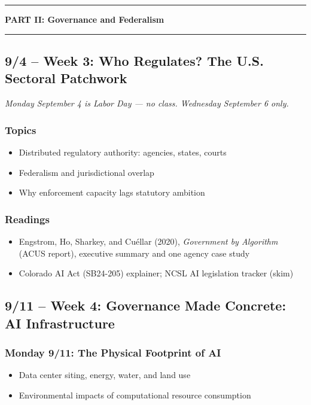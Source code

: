 \documentclass[12pt]{article}
\begin{document}
\bigskip
\noindent\rule{\textwidth}{0.6pt}
\begin{center}\textbf{PART II: Governance and Federalism}\end{center}
\noindent\rule{\textwidth}{0.6pt}

\subsection*{9/4 -- Week 3: Who Regulates? The U.S. Sectoral Patchwork}
\emph{Monday September 4 is Labor Day --- no class. Wednesday September 6 only.}
    \subsubsection*{Topics}
        \begin{itemize}
            \item Distributed regulatory authority: agencies, states, courts
            \item Federalism and jurisdictional overlap
            \item Why enforcement capacity lags statutory ambition
        \end{itemize}
    \subsubsection*{Readings}
        \begin{itemize}
            \item Engstrom, Ho, Sharkey, and Cu\'ellar (2020), \emph{Government by Algorithm} (ACUS report), executive summary and one agency case study
            \item Colorado AI Act (SB24-205) explainer; NCSL AI legislation tracker (skim)
        \end{itemize}

\subsection*{9/11 -- Week 4: Governance Made Concrete: AI Infrastructure}
    \subsubsection*{Monday 9/11: The Physical Footprint of AI}
        \begin{itemize}
            \item Data center siting, energy, water, and land use
            \item Environmental impacts of computational resource consumption
        \end{itemize}
\end{document}

